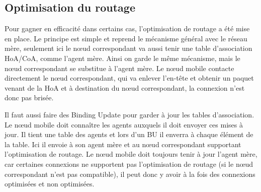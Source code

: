 \subsection{Optimisation du routage}

Pour gagner en efficacité dans certains cas, l’optimisation de routage a été mise en place.
Le principe est simple et reprend le mécanisme général avec le réseau mère, seulement ici le nœud correspondant va aussi tenir une table d’association HoA/CoA, comme l'agent mère.
Ainsi on garde le même mécanisme, mais le nœud correspondant se substitue à l'agent mère.
Le nœud mobile contacte directement le nœud correspondant, qui va enlever l’en-tête et obtenir un paquet venant de la HoA et à destination du nœud correspondant, la connexion n’est donc pas brisée.


Il faut aussi faire des Binding Update pour garder à jour les tables d’association.
Le nœud mobile doit connaître les agents auxquels il doit envoyer ces mises à jour.
Il tient une table des agents et lors d’un BU il enverra à chaque élément de la table. Ici il envoie à son agent mère et au nœud correspondant supportant l’optimisation de routage.
Le nœud mobile doit toujours tenir à jour l’agent mère, car certaines connexions ne supportent pas l’optimisation de routage (si le nœud correspondant n'est pas compatible), il peut donc y avoir à la fois des connexions optimisées et non optimisées.


